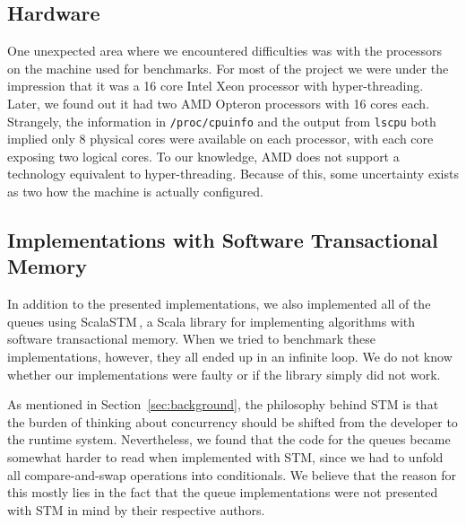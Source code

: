 \subsection{Hardware}
\label{sub:hardware}
One unexpected area where we encountered difficulties was with the processors
on the machine used for benchmarks. For most of the project we were under the
impression that it was a 16 core Intel Xeon processor with hyper-threading.
Later, we found out it had two AMD Opteron processors with 16 cores each.
Strangely, the information in \texttt{/proc/cpuinfo} and the output from
\texttt{lscpu} both implied only 8 physical cores were available on each
processor, with each core exposing two logical cores. To our knowledge, AMD
does not support a technology equivalent to hyper-threading. Because of this,
some uncertainty exists as two how the machine is actually configured.

\subsection{Implementations with Software Transactional Memory}
\label{sub:stm_queues}
In addition to the presented implementations, we also implemented all of the queues using ScalaSTM\,\citep{ScalaSTM}, a Scala library for implementing algorithms with software transactional memory. When we tried to benchmark these implementations, however, they all ended up in an infinite loop. We do not know whether our implementations were faulty or if the library simply did not work.

As mentioned in Section~\ref{sec:background}, the philosophy behind STM is that the burden of thinking about concurrency should be shifted from the developer to the runtime system. Nevertheless, we found that the code for the queues became somewhat harder to read when implemented with STM, since we had to unfold all compare-and-swap operations into conditionals. We believe that the reason for this mostly lies in the fact that the queue implementations were not presented with STM in mind by their respective authors.
